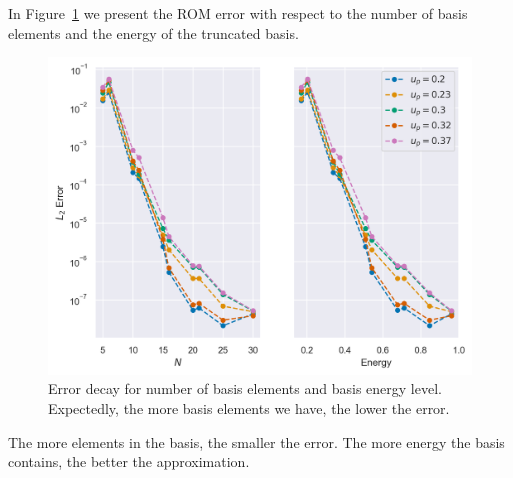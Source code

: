 \documentclass[../../thesis.tex]{subfiles}
\begin{document}
In Figure~\ref{fig:error_decay} we present the ROM error with respect to 
the number of basis elements and the energy of the truncated basis.
\begin{figure}[h]
    \centering
    \includegraphics[width=\columnwidth]{research_project/piston/figures/rb_certification/error_decay.png}
    \caption{Error decay for number of basis elements and basis energy level.
    Expectedly, the more basis elements we have, the lower the error.}
    \label{fig:error_decay}
\end{figure}
The more elements in the basis, the smaller the error.
The more energy the basis contains, the better the approximation.
\end{document}
